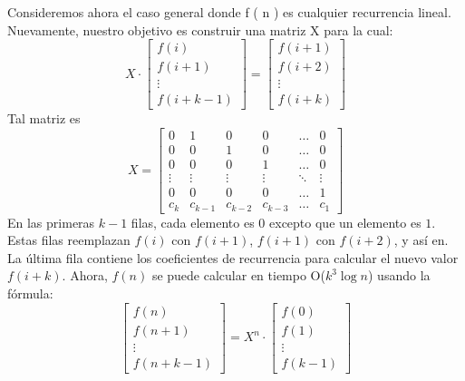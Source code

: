 \begin{itemize}
Consideremos ahora el caso general donde f ( n ) es cualquier recurrencia lineal. Nuevamente, nuestro objetivo es construir una matriz X para la cual:
 $$ X \cdot \begin{bmatrix}
 	f ( i )  \\
 	f ( i+1 ) \\
 	\vdots \\
 	f(i+k-1) 
 \end{bmatrix} =   \begin{bmatrix}
 	f(i+1)  \\
 	f(i+2) \\
 	\vdots \\
 	f(i+k) 
 \end{bmatrix} $$
 Tal matriz es
 $$ X = 
 \begin{bmatrix}
 	0      &      1 &      0 &      0 & \ldots & 0  \\
 	0      &      0 &      1 &      0 & \ldots & 0  \\
 	0      &      0 &      0 &      1 & \ldots & 0  \\
 	\vdots & \vdots & \vdots & \vdots & \ddots & \vdots  \\
 	0      &      0 &      0 &      0 & \ldots & 1  \\
 	c_k    & c_{k-1}&c_{k-2} &c_{k-3} & \ldots & c_{1}
 \end{bmatrix}$$
 En las primeras $k-1$ filas, cada elemento es $0$ excepto que un elemento es $1$. Estas filas reemplazan $f(i)$ con $f(i+1)$, $f(i+1)$ con $f(i+2)$, y así en. La última fila contiene los coeficientes de recurrencia para calcular el nuevo valor $f(i+k)$.
 Ahora, $f(n)$ se puede calcular en tiempo O($k^3\log n$) usando la fórmula:
 $$  \begin{bmatrix}
 	f ( n )  \\
 	f ( n+1 ) \\
 	\vdots \\
 	f(n+k-1) 
 \end{bmatrix} = X^n \cdot  \begin{bmatrix}
 f(0)  \\
 f(1) \\
 \vdots \\
 f(k-1) 
\end{bmatrix} $$
\end{itemize}